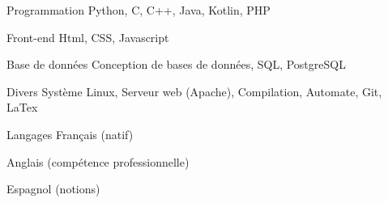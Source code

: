 

\begin{cvskills}
  \cvskill
    {Programmation} %
    {Python, C, C++, Java, Kotlin, PHP} %

  \cvskill
  {Front-end} %
  {Html, CSS, Javascript} %

  \cvskill
    {Base de données} %
    {Conception de bases de données, SQL, PostgreSQL} %

  \cvskill
    {Divers} %
    {Système Linux, Serveur web (Apache), Compilation, Automate, Git, LaTex} %

  \cvskill
    {Langages} %
    {Français (natif)} %

  \cvskill
    {} %
    {Anglais (compétence professionnelle)} %

  \cvskill
    {} %
    {Espagnol (notions)} %


\end{cvskills}
